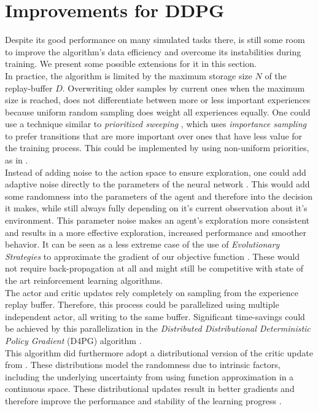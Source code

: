 \section{Improvements for DDPG}
\label{sec:improvements}
Despite its good performance on many simulated tasks there, is still some room to improve the algorithm's data efficiency and overcome its instabilities during training. We present some possible extensions for it in this section.\\
In practice, the algorithm is limited by the maximum storage size $\mathit{N}$ of the replay-buffer $\mathit{D}$. Overwriting older samples by current ones when the maximum size is reached, does not differentiate between more or less important experiences because uniform random sampling does weight all experiences equally. One could use a technique similar to \textit{prioritized sweeping} \citep{moore1993prioritized}, which uses \textit{importance sampling} \citep{glynn1989importance} to prefer transitions that are more important over ones that have less value for the training process. This could be implemented by using non-uniform priorities, as in \citep{schaul2015prioritized,barth2018distributed}.\\
Instead of adding noise to the action space to ensure exploration, one could add adaptive noise directly to the parameters of the neural network \citep{plappert2017parameter}. This would add some randomness into the parameters of the agent and therefore into the decision it makes, while still always fully depending on it's current observation about it's environment. This parameter noise makes an agent's exploration more consistent and results in a more effective exploration, increased performance and smoother behavior. 
It can be seen as a less extreme case of the use of \textit{Evolutionary Strategies} to approximate the gradient of our objective function \citep{salimans2017evolution}. These would not require back-propagation at all and might still be competitive with state of the art reinforcement learning algorithms.\\
The actor and critic updates rely completely on sampling from the experience replay buffer. Therefore, this process could be parallelized using multiple independent actor, all writing to the same buffer. Significant time-savings could be achieved by this parallelization in the \textit{Distributed Distributional Deterministic Policy Gradient} (D4PG) algorithm  \citep{barth2018distributed}.\\
This algorithm did furthermore adopt a distributional version of the critic update from \citep{bellemare2017distributional}. These distributions model the randomness due to intrinsic factors, including the underlying uncertainty from using function approximation in a continuous space. These distributional updates result in better gradients and therefore improve the performance and stability of the learning progress \citep{barth2018distributed}.\\
